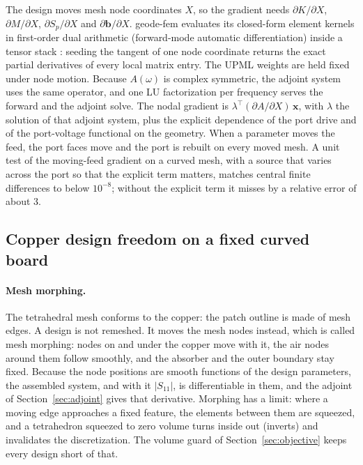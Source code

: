 \documentclass{anvil-paper}
\begin{document}
The design moves mesh node coordinates $X$, so the gradient needs
$\partial K/\partial X$, $\partial M/\partial X$, $\partial S_p/\partial X$
and $\partial \mathbf{b}/\partial X$. geode-fem evaluates its closed-form
element kernels in first-order dual arithmetic (forward-mode automatic
differentiation) inside a tensor stack \citep{burn}: seeding the tangent of one
node coordinate returns the exact partial derivatives of every local matrix
entry. The UPML weights are held fixed under node motion. Because $A(\omega)$
is complex symmetric, the adjoint system uses the same operator, and one LU
factorization per frequency serves the forward and the adjoint solve. The
nodal gradient is $\lambda^{\top}(\partial A/\partial X)\,\mathbf{x}$, with
$\lambda$ the solution of that adjoint system, plus the explicit dependence of the port drive and of the port-voltage functional on
the geometry. When a parameter moves the feed, the port faces move and the
port is rebuilt on every moved mesh. A unit test of the moving-feed gradient
on a curved mesh, with a source that varies across the port so that the
explicit term matters, matches central finite differences to below
$10^{-8}$; without the explicit term it misses by a relative error of about 3.

\subsection{Copper design freedom on a fixed curved board}
\label{sec:freedom}

\paragraph{Mesh morphing.}
The tetrahedral mesh conforms to the copper: the patch outline is made of
mesh edges. A design is not remeshed. It moves the mesh nodes instead, which is called mesh
morphing: nodes on and under the copper move with it, the air nodes around
them follow smoothly, and the absorber and the outer boundary stay fixed.
Because the node positions are smooth functions of the design parameters,
the assembled system, and with it $|S_{11}|$, is differentiable in them, and
the adjoint of Section~\ref{sec:adjoint} gives that derivative. Morphing has
a limit: where a moving edge approaches a fixed feature, the elements between
them are squeezed, and a tetrahedron squeezed to zero volume turns inside out
(inverts) and invalidates the discretization. The volume guard of
Section~\ref{sec:objective} keeps every design short of that.
\end{document}
